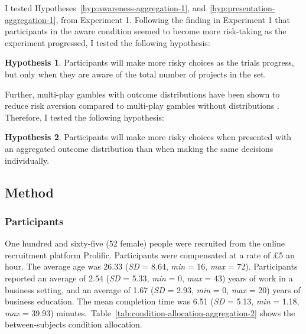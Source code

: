 \documentclass[a4paper, nobind, dvipsnames]{templates/ociamthesis}
\theoremstyle{definition}
\theoremstyle{definition}
\theoremstyle{definition}
\theoremstyle{definition}
\newtheorem{hypothesis}{Hypothesis}[chapter]
\theoremstyle{remark}
\begin{document}
I tested Hypotheses~\ref{hyp:awareness-aggregation-1},
and~\ref{hyp:presentation-aggregation-1}, from Experiment 1. Following the
finding in Experiment 1 that participants in the aware condition seemed to
become more risk-taking as the experiment progressed, I tested the following
hypothesis:

\begin{hypothesis}
\protect\hypertarget{hyp:awareness-trials-aggregation-2}{}{\label{hyp:awareness-trials-aggregation-2} }Participants will make more risky choices as the trials progress, but only when
they are aware of the total number of projects in the set.
\end{hypothesis}

Further, multi-play gambles with outcome distributions have been shown to reduce
risk aversion compared to multi-play gambles without distributions \autocites[e.g.,][]{redelmeier1992,webb2017}. Therefore, I tested the following hypothesis:

\begin{hypothesis}
\protect\hypertarget{hyp:distribution-aggregation-2}{}{\label{hyp:distribution-aggregation-2} }Participants will make more risky choices when presented with an aggregated
outcome distribution than when making the same decisions individually.
\end{hypothesis}

\hypertarget{method-1}{%
\subsection{Method}\label{method-1}}

\hypertarget{participants-1}{%
\subsubsection{Participants}\label{participants-1}}

One hundred and sixty-five (52 female) people were recruited from the online recruitment platform Prolific. Participants were compensated at a rate of £5 an hour. The average age was 26.33 (\emph{SD} = 8.64, \emph{min} = 16, \emph{max} = 72). Participants reported an average of 2.54 (\emph{SD} = 5.33, \emph{min} = 0, \emph{max} = 43) years of work in a business setting, and an average of 1.67 (\emph{SD} = 2.93, \emph{min} = 0, \emph{max} = 20) years of business education. The mean completion time was 6.51 (\emph{SD} = 5.13, \emph{min} = 1.18, \emph{max} = 39.93) minutes.~Table~\ref{tab:condition-allocation-aggregation-2}
shows the between-subjects condition allocation.
\end{document}
